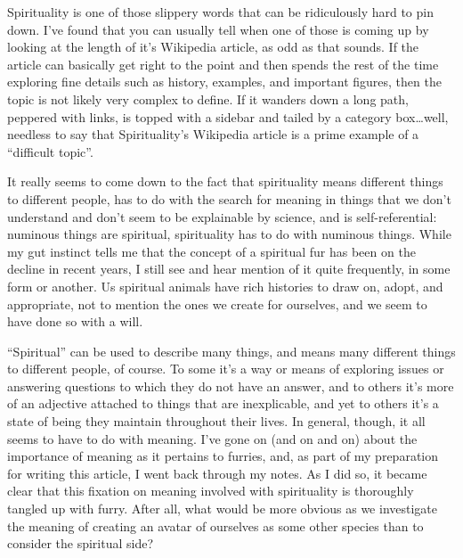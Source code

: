 
Spirituality is one of those slippery words that can be ridiculously hard to pin down.  I've found that you can usually tell when one of those is coming up by looking at the length of it's Wikipedia article, as odd as that sounds. If the article can basically get right to the point and then spends the rest of the time exploring fine details such as history, examples, and important figures, then the topic is not likely very complex to define. If it wanders down a long path, peppered with links, is topped with a sidebar and tailed by a category box\ldots{}well, needless to say that Spirituality's Wikipedia article is a prime example of a ``difficult topic''.

It really seems to come down to the fact that spirituality means different things to different people, has to do with the search for meaning in things that we don't understand and don't seem to be explainable by science, and is self-referential: numinous things are spiritual, spirituality has to do with numinous things. While my gut instinct tells me that the concept of a spiritual fur has been on the decline in recent years, I still see and hear mention of it quite frequently, in some form or another. Us spiritual animals have rich histories to draw on, adopt, and appropriate, not to mention the ones we create for ourselves, and we seem to have done so with a will.

``Spiritual'' can be used to describe many things, and means many different things to different people, of course. To some it's a way or means of exploring issues or answering questions to which they do not have an answer, and to others it's more of an adjective attached to things that are inexplicable, and yet to others it's a state of being they maintain throughout their lives. In general, though, it all seems to have to do with meaning. I've gone on (and on and on) about the importance of meaning as it pertains to furries, and, as part of my preparation for writing this article, I went back through my notes. As I did so, it became clear that this fixation on meaning involved with spirituality is thoroughly tangled up with furry. After all, what would be more obvious as we investigate the meaning of creating an avatar of ourselves as some other species than to consider the spiritual side?

